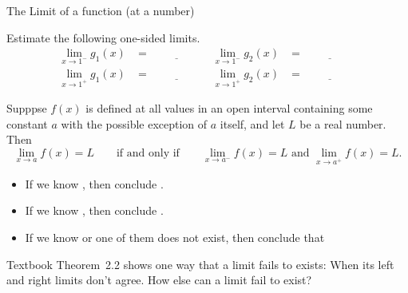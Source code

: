 \documentclass[../main.tex]{subfiles}
\begin{document}
\begin{lesson}{The Limit of a function (at a number)}
\begin{example}
\begin{center}
    \end{center}

    Estimate the following one-sided limits.
    \begin{align*}
      \lim_{x \to 1^{-}} g_{1}(x) 
      &= \underline{\hspace{2cm}}
      & \lim_{x \to 1^{-}} g_{2}(x) 
      &= \underline{\hspace{2cm}} \\[2ex]
      \lim_{x \to 1^{+}} g_{1}(x) 
      &= \underline{\hspace{2cm}}
      & \lim_{x \to 1^{+}} g_{2}(x) 
      &= \underline{\hspace{2cm}}
    \end{align*}
  \end{example}
  
  \begin{mdframed}[style=withref-compact]
    Supppse \(f(x)\) is defined at all values in an open interval containing some constant \(a\) with the possible exception of \(a\) itself, and let \(L\) be a real number. Then
    \[
      \lim_{x \to a} f(x) = L \qquad\text{if and only if}\qquad \lim_{x \to a^{-}} f(x) = L \text{ and } \lim_{x \to a^{+}} f(x) = L.
    \]
  \end{mdframed}
  
  \begin{itemize}[topsep={1ex}]
    \item If we know \underline{\hspace{2in}}, then conclude \underline{\hspace{3in}}.
      \vfill{}

    \item If we know \underline{\hspace{2in}}, then conclude \underline{\hspace{3in}}.
      \vfill{}
    \item If we know \underline{\hspace{2in}} or one of them does not exist, then conclude that 
      \vfill{}
  \end{itemize}
  \clearpage
  

  Textbook Theorem~2.2 shows one way that a limit fails to exists: When its left and right limits don't agree. How else can a limit fail to exist?


\end{lesson}
\end{document}
